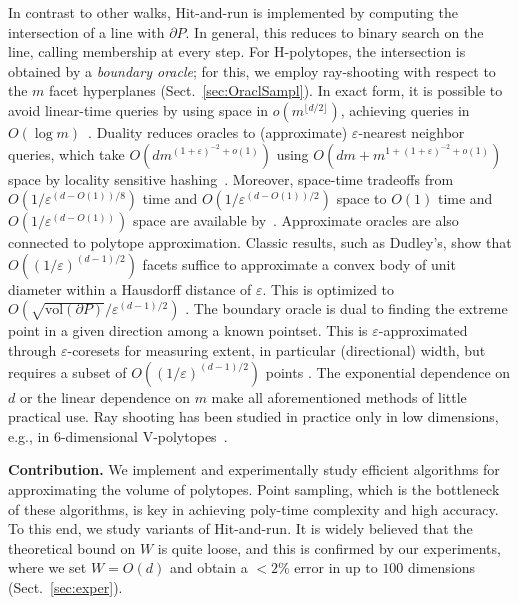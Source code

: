 \documentclass[11pt,a4paper]{article}
\def\vol{\mbox{vol}}
\def\vol{\mbox{vol}}
\begin{document}
In contrast to other walks, Hit-and-run is implemented by 
computing the intersection of a line with $\partial P$.  
In general, this reduces to binary search on the line,
calling membership at every step. 
For H-polytopes, the intersection is obtained by a {\em boundary oracle};
for this, we employ ray-shooting with respect to
the $m$ facet hyperplanes (Sect.~\ref{sec:OraclSampl}).
In exact form, it is possible to avoid linear-time queries by using space in $o(m^{\lfloor d/2 \rfloor})$,
achieving queries in $O(\log m)$~\cite{Ramos99}.
Duality reduces oracles to (approximate) $\varepsilon$-nearest neighbor
queries, which take 
$O(dm^{(1+\varepsilon)^{-2}+o(1)})$
using $O(dm + m^{1+(1+\varepsilon)^{-2}+o(1)})$ space by locality sensitive hashing~\cite{Andoni08}.
Moreover, space-time tradeoffs from $O(1/\varepsilon^{(d-O(1))/8})$ time
and $O(1/\varepsilon^{(d-O(1))/2})$ space to $O(1)$ time and 
$O(1/\varepsilon^{(d-O(1))})$ space are available by~\cite{AryaFonsMoun12socg}.
Approximate oracles are also connected to polytope approximation.
Classic results, such as Dudley's, show that $O((1/\varepsilon)^{(d-1)/2})$ facets suffice to approximate a convex body of unit diameter
within a Hausdorff distance of $\varepsilon$.
This is optimized to $O(\sqrt{\vol( \partial P )}/\varepsilon^{(d-1)/2})$ \cite{AryaFonsMoun12socg}.
The boundary oracle is dual to finding the extreme point in
a given direction among a known pointset.
This is $\varepsilon$-approximated through $\varepsilon$-coresets
for measuring extent, in particular (directional) width, but requires
a subset of $O((1/ \varepsilon)^{(d-1)/2})$ points
\cite{AgarwalHPVa05}.  
The exponential dependence on $d$ or the linear dependence on $m$
make all aforementioned methods of little practical use.
Ray shooting has been studied in practice only in low dimensions,
e.g., in 6-dimensional V-polytopes~\cite{ZhenYaman13}. 

\textbf{Contribution.}
We implement and experimentally study efficient algorithms for approximating
the volume of polytopes. Point sampling, which is the bottleneck of these algorithms,
is key in achieving poly-time complexity and high accuracy.
To this end, we study variants of Hit-and-run. 
It is widely believed that the theoretical bound on $W$ is quite loose,
and this is confirmed by our experiments, where we set $W = O(d)$
and obtain a $<2\%$ error in up to $100$ dimensions (Sect.~\ref{sec:exper}).  
\end{document}

